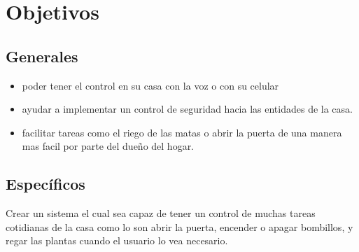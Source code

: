 
\section{Objetivos}
\subsection{Generales}
\begin{itemize}
\item poder tener el control en su casa con la voz o con su celular
\item ayudar a implementar un control de seguridad hacia las entidades de la casa.
\item facilitar tareas como el riego de las matas o abrir la puerta de una manera mas facil por parte del dueño del hogar.
\end{itemize}
\subsection{Específicos}
Crear un sistema el cual sea capaz de tener un control de muchas tareas cotidianas de la casa como lo son abrir la puerta, encender o apagar bombillos, y regar las plantas cuando el usuario lo vea necesario.